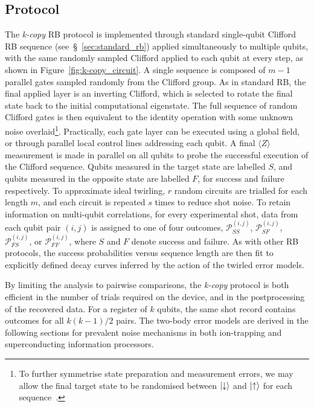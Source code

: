 \subsection{Protocol}
The \emph{k-copy} RB protocol is implemented through standard single-qubit Clifford RB sequence (see~\S~\ref{sec:standard_rb}) applied simultaneously to multiple qubits, with the same randomly sampled Clifford applied to each qubit at every step, as shown in Figure~\ref{fig:k-copy_circuit}. A single sequence is composed of $m-1$ parallel gates sampled randomly from the Clifford group. As in standard RB, the final applied layer is an inverting Clifford, which is selected to rotate the final state back to the initial computational eigenstate. The full sequence of random Clifford gates is then equivalent to the identity operation with some unknown noise overlaid\footnote{To further symmetrise state preparation and measurement errors, we may allow the final target state to be randomised between $\ket{\downarrow}$ and $\ket{\uparrow}$ for each sequence~\cite{knill_randomized_2008}.}.
Practically, each gate layer can be executed using a global field, or through parallel local control lines addressing each qubit. A final $\langle Z\rangle$ measurement is made in parallel on all qubits to probe the successful execution of the Clifford sequence. Qubits measured in the target state are labelled $S$, and qubits measured in the opposite state are labelled $F$, for success and failure respectively. To approximate ideal twirling, $r$ random circuits are trialled for each length $m$, and each circuit is repeated $s$ times to reduce shot noise.
To retain information on multi-qubit correlations, for every experimental shot, data from each qubit pair $(i,j)$ is assigned to one of four outcomes, $\mathcal{P}_{SS}^{(i,j)}$, $\mathcal{P}_{SF}^{(i,j)}$, $\mathcal{P}_{FS}^{(i,j)}$, or $\mathcal{P}_{FF}^{(i,j)}$, where $S$ and $F$ denote success and failure. As with other RB protocols, the success probabilities versus sequence length are then fit to explicitly defined decay curves inferred by the action of the twirled error models. 

By limiting the analysis to pairwise comparisons, the \emph{k-copy} protocol is both efficient in the number of trials required on the device, and in the postprocessing of the recovered data. For a register of $k$ qubits, the same shot record contains outcomes for all $k(k-1)/2$ pairs. 
The two-body error models are derived in the following sections for prevalent noise mechanisms in both ion-trapping and superconducting information processors. 

